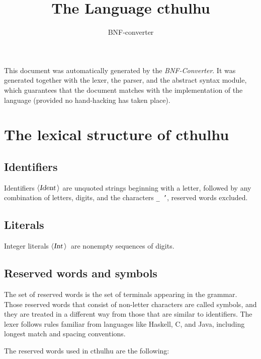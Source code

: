 \documentclass[a4paper,11pt]{article}
\author{BNF-converter}
\title{The Language cthulhu}
\begin{document}
\maketitle

\newcommand{\emptyP}{\mbox{$\epsilon$}}
\newcommand{\terminal}[1]{\mbox{{\texttt {#1}}}}
\newcommand{\nonterminal}[1]{\mbox{$\langle \mbox{{\sl #1 }} \! \rangle$}}
\newcommand{\arrow}{\mbox{::=}}
\newcommand{\delimit}{\mbox{$|$}}
\newcommand{\reserved}[1]{\mbox{{\texttt {#1}}}}
\newcommand{\literal}[1]{\mbox{{\texttt {#1}}}}
\newcommand{\symb}[1]{\mbox{{\texttt {#1}}}}

This document was automatically generated by the {\em BNF-Converter}. It was generated together with the lexer, the parser, and the abstract syntax module, which guarantees that the document matches with the implementation of the language (provided no hand-hacking has taken place).

\section*{The lexical structure of cthulhu}
\subsection*{Identifiers}
Identifiers \nonterminal{Ident} are unquoted strings beginning with a letter,
followed by any combination of letters, digits, and the characters {\tt \_ '},
reserved words excluded.


\subsection*{Literals}
Integer literals \nonterminal{Int}\ are nonempty sequences of digits.




\subsection*{Reserved words and symbols}
The set of reserved words is the set of terminals appearing in the grammar. Those reserved words that consist of non-letter characters are called symbols, and they are treated in a different way from those that are similar to identifiers. The lexer follows rules familiar from languages like Haskell, C, and Java, including longest match and spacing conventions.

The reserved words used in cthulhu are the following: \\
\end{document}

